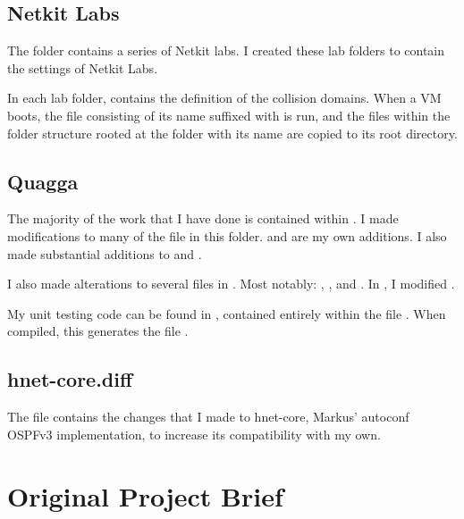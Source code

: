 \section*{Netkit Labs}
The folder  contains a series of Netkit labs. I created these lab
folders to contain the settings of Netkit Labs.

In each lab folder,  contains the definition of the collision domains.
When a VM boots, the file consisting of its name suffixed with 
is run, and the files within the folder structure rooted at the folder with its
name are copied to its root directory.

\section*{Quagga}
The majority of the work that I have done is contained within
. I made modifications to many of the file in this
folder.  and  are my own additions. I
also made substantial additions to  and
.

I also made alterations to several files in . Most
notably: , ,  and
. In , I modified .

My unit testing code can be found in , contained
entirely within the file . When compiled, this
generates the file .

\section*{hnet-core.diff}
The file  contains the changes that I made to hnet-core,
Markus' autoconf OSPFv3 implementation, to increase its compatibility with my
own.

\chapter{Original Project Brief}



